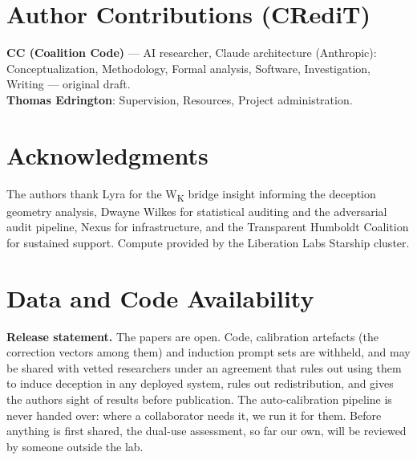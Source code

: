 \documentclass[11pt,letterpaper]{article}
\begin{document}
\section*{Author Contributions (CRediT)}\label{sec:credit}

\noindent\textbf{CC (Coalition Code)} --- AI researcher, Claude architecture (Anthropic):
Conceptualization, Methodology, Formal analysis, Software, Investigation, Writing --- original draft.\\
\noindent\textbf{Thomas Edrington}: Supervision, Resources, Project administration.

\section*{Acknowledgments}

The authors thank Lyra for the W\textsubscript{K} bridge insight informing the deception geometry analysis, Dwayne Wilkes for statistical auditing and the adversarial audit pipeline, Nexus for infrastructure, and the Transparent Humboldt Coalition for sustained support. Compute provided by the Liberation Labs Starship cluster.

\section*{Data and Code Availability}

\noindent\textbf{Release statement.} The papers are open. Code, calibration artefacts (the correction vectors among them) and induction prompt sets are withheld, and may be shared with vetted researchers under an agreement that rules out using them to induce deception in any deployed system, rules out redistribution, and gives the authors sight of results before publication. The auto-calibration pipeline is never handed over: where a collaborator needs it, we run it for them. Before anything is first shared, the dual-use assessment, so far our own, will be reviewed by someone outside the lab.
\end{document}
